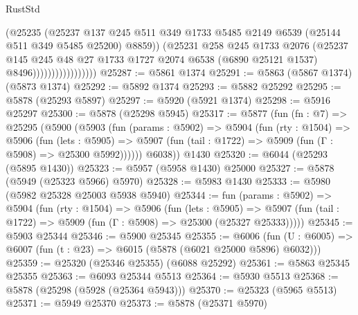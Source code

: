 \begin{lexlean}{RustStd}
\begin{coremodule}
                                  (@25235
                                    (@25237
                                      @137
                                      @245
                                      @511
                                      @349
                                      @1733
                                      @5485
                                      @2149
                                      @6539
                                      (@25144 @511 @349 @5485 @25200)
                                      @8859))
                                  (@25231
                                    @258
                                    @245
                                    @1733
                                    @2076
                                    (@25237
                                      @145
                                      @245
                                      @48
                                      @27
                                      @1733
                                      @1727
                                      @2074
                                      @6538
                                      (@6890 @25121 @1537)
                                      @8496)))))))))))))))))
@25287 := @5861 @1374
@25291 := @5863 (@5867 @1374) (@5873 @1374)
@25292 := @5892 @1374
@25293 := @5882 @25292
@25295 := @5878 (@25293 @5897)
@25297 := @5920 (@5921 @1374)
@25298 := @5916 @25297
@25300 := @5878 (@25298 @5945)
@25317 := @5877
    (fun (fn : @7) =>
    @25295
      (@5900
        (@5903
          (fun (params : @5902) =>
          @5904
            (fun (rty : @1504) =>
            @5906
              (fun (lets : @5905) =>
              @5907 (fun (tail : @1722) => @5909 (fun (Γ : @5908) => @25300 @5992))))))
        @6038))
    @1430
@25320 := @6044 (@25293 (@5895 @1430))
@25323 := @5957 (@5958 @1430) @25000
@25327 := @5878 (@5949 (@25323 @5966) @5970)
@25328 := @5983 @1430
@25333 := @5980 (@5982 @25328 @25003 @5938 @5940)
@25344 := fun (params : @5902) =>
  @5904
    (fun (rty : @1504) =>
    @5906
      (fun (lets : @5905) =>
      @5907 (fun (tail : @1722) => @5909 (fun (Γ : @5908) => @25300 (@25327 @25333)))))
@25345 := @5903 @25344
@25346 := @5900 @25345
@25355 := @6006
    (fun (U : @6005) => @6007 (fun (t : @23) => @6015 (@5878 (@6021 @25000 @5896) @6032)))
@25359 := @25320 (@25346 @25355) (@6088 @25292)
@25361 := @5863 @25345 @25355
@25363 := @6093 @25344 @5513
@25364 := @5930 @5513
@25368 := @5878 (@25298 (@5928 (@25364 @5943)))
@25370 := @25323 (@5965 @5513)
@25371 := @5949 @25370
@25373 := @5878 (@25371 @5970)

\end{coremodule}
\end{lexlean}
